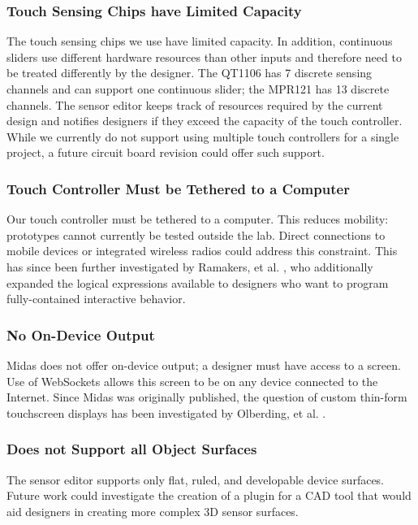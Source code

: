 \subsubsection{Touch Sensing Chips have Limited Capacity}
The touch sensing chips we use have limited capacity. In addition, continuous sliders use different hardware resources than other inputs and therefore need to be treated differently by the designer. The QT1106 has 7 discrete sensing channels and can support one continuous slider; the MPR121 has 13 discrete channels. The sensor editor keeps track of resources required by the current design and notifies designers if they exceed the capacity of the touch controller. While we currently do not support using multiple touch controllers for a single project, a future circuit board revision could offer such support. 

\subsubsection{Touch Controller Must be Tethered to a Computer}
Our touch controller must be tethered to a computer. This reduces mobility: prototypes cannot currently be tested outside the lab. Direct connections to mobile devices or integrated wireless radios could address this constraint. This has since been further investigated by Ramakers, et al. \cite{ramakers-paperpulse}, who additionally expanded the logical expressions available to designers who want to program fully-contained interactive behavior.

\subsubsection{No On-Device Output}
Midas does not offer on-device output; a designer must have access to a screen. Use of WebSockets allows this screen to be on any device connected to the Internet. Since Midas was originally published, the question of custom thin-form touchscreen displays has been investigated by Olberding, et al. \cite{olberding-printscreen}.

\subsubsection{Does not Support all Object Surfaces}
The sensor editor supports only flat, ruled, and developable device surfaces. Future work could investigate the creation of a plugin for a CAD tool that would aid designers in creating more complex 3D sensor surfaces.